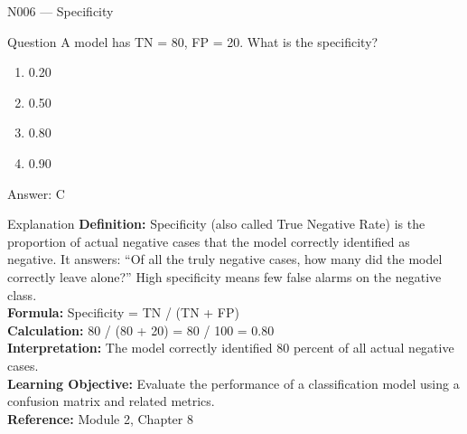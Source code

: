 \documentclass[aspectratio=169,8pt]{beamer}
\begin{document}
	\begin{frame}{N006 --- Specificity}
		\begin{block}{Question}
			A model has TN = 80, FP = 20. What is the specificity?
			\begin{enumerate}
				\item 0.20
				\item 0.50
				\item 0.80
				\item 0.90
			\end{enumerate}
		\end{block}
		\begin{exampleblock}{Answer: C}\end{exampleblock}
		\begin{block}{Explanation}
			\textbf{Definition:} Specificity (also called True Negative Rate) is the proportion of actual negative cases that the model correctly identified as negative. It answers: ``Of all the truly negative cases, how many did the model correctly leave alone?'' High specificity means few false alarms on the negative class.\\
			\textbf{Formula:} Specificity = TN / (TN + FP)\\
			\textbf{Calculation:} 80 / (80 + 20) = 80 / 100 = 0.80\\
			\textbf{Interpretation:} The model correctly identified 80 percent of all actual negative cases.\\
			\textbf{Learning Objective:} Evaluate the performance of a classification model using a confusion matrix and related metrics.\\
			\textbf{Reference:} Module 2, Chapter 8
		\end{block}
	\end{frame}
	
\end{document}
